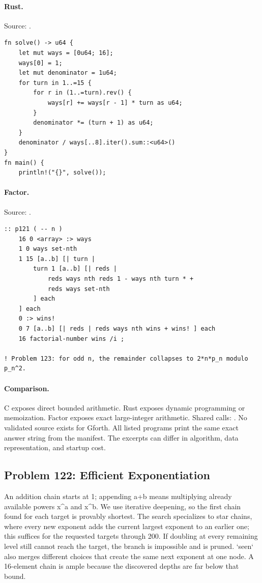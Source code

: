 \paragraph{Rust.} Source: .
\begin{lstlisting}
fn solve() -> u64 {
    let mut ways = [0u64; 16];
    ways[0] = 1;
    let mut denominator = 1u64;
    for turn in 1..=15 {
        for r in (1..=turn).rev() {
            ways[r] += ways[r - 1] * turn as u64;
        }
        denominator *= (turn + 1) as u64;
    }
    denominator / ways[..8].iter().sum::<u64>()
}
fn main() {
    println!("{}", solve());
\end{lstlisting}

\paragraph{Factor.} Source: .
\begin{lstlisting}
:: p121 ( -- n )
    16 0 <array> :> ways
    1 0 ways set-nth
    1 15 [a..b] [| turn |
        turn 1 [a..b] [| reds |
            reds ways nth reds 1 - ways nth turn * +
            reds ways set-nth
        ] each
    ] each
    0 :> wins!
    0 7 [a..b] [| reds | reds ways nth wins + wins! ] each
    16 factorial-number wins /i ;

! Problem 123: for odd n, the remainder collapses to 2*n*p_n modulo p_n^2.
\end{lstlisting}

\paragraph{Comparison.}
C exposes direct bounded arithmetic. Rust exposes dynamic programming or memoization. Factor exposes exact large-integer arithmetic. Shared calls: \texttt{}.
No validated source exists for Gforth.
All listed programs print the same exact answer string from the manifest. The excerpts can differ in algorithm, data representation, and startup cost.

\subsection{Problem 122: Efficient Exponentiation}
\label{walkthrough:p122}
An addition chain starts at 1; appending a+b means multiplying already available powers x\textasciicircum{}a and x\textasciicircum{}b. We use iterative deepening, so the first chain found for each target is provably shortest. The search specializes to star chains, where every new exponent adds the current largest exponent to an earlier one; this suffices for the requested targets through 200. If doubling at every remaining level still cannot reach the target, the branch is impossible and is pruned. `seen` also merges different choices that create the same next exponent at one node. A 16-element chain is ample because the discovered depths are far below that bound.

